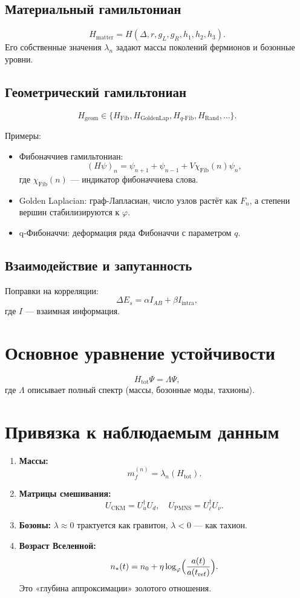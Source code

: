 \documentclass[12pt,a4paper]{article}
\begin{document}
\subsection{Материальный гамильтониан}
\[
H_{\mathrm{matter}} = H(\Delta, r, g_L, g_R, h_1, h_2, h_3).
\]
Его собственные значения $\lambda_n$ задают массы поколений фермионов и бозонные уровни.

\subsection{Геометрический гамильтониан}
\[
H_{\mathrm{geom}} \in \{ H_{\mathrm{Fib}}, H_{\mathrm{GoldenLap}}, H_{q\text{-Fib}}, H_{\mathrm{Rand}}, \dots \}.
\]

Примеры:
\begin{itemize}
    \item Фибоначчиев гамильтониан:
    \[
    (H\psi)_n = \psi_{n+1} + \psi_{n-1} + V\chi_{\text{Fib}}(n)\psi_n,
    \]
    где $\chi_{\text{Fib}}(n)$ — индикатор фибоначчиева слова.
    \item Golden Laplacian: граф-Лапласиан, число узлов растёт как $F_n$, а степени вершин стабилизируются к $\varphi$.
    \item q-Фибоначчи: деформация ряда Фибоначчи с параметром $q$.
\end{itemize}

\subsection{Взаимодействие и запутанность}
Поправки на корреляции:
\[
\Delta E_s = \alpha I_{AB} + \beta I_{\mathrm{intra}},
\]
где $I$ — взаимная информация.

\section{Основное уравнение устойчивости}
\[
H_{\mathrm{tot}} \Psi = \Lambda \Psi ,
\]
где $\Lambda$ описывает полный спектр (массы, бозонные моды, тахионы).

\section{Привязка к наблюдаемым данным}
\begin{enumerate}
    \item \textbf{Массы:}
    \[
    m_f^{(n)} = \lambda_n(H_{\mathrm{tot}}).
    \]
    \item \textbf{Матрицы смешивания:}
    \[
    U_{\mathrm{CKM}} = U_u^\dagger U_d, \quad U_{\mathrm{PMNS}} = U_\ell^\dagger U_\nu.
    \]
    \item \textbf{Бозоны:}  
    $\lambda \approx 0$ трактуется как гравитон, $\lambda < 0$ — как тахион.
    \item \textbf{Возраст Вселенной:}
    \[
    n_*(t) = n_0 + \eta \log_{\varphi}\!\Big(\frac{a(t)}{a(t_{\rm ref})}\Big).
    \]
    Это «глубина аппроксимации» золотого отношения.
\end{enumerate}
\end{document}
